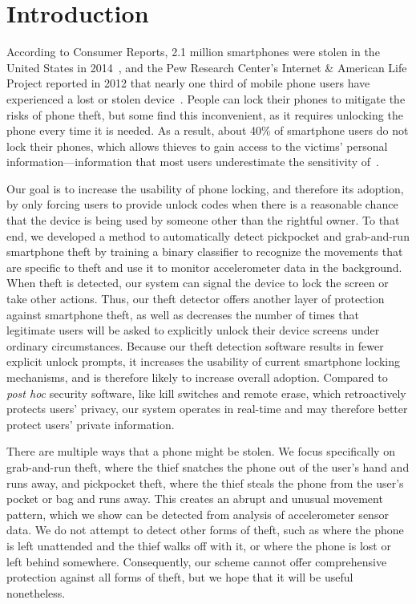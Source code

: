 \section{Introduction}

According to Consumer Reports, 2.1 million smartphones were stolen in the United States in 2014~\cite{deitrick:consumer}, and the Pew Research Center's Internet \& American Life Project reported in 2012 that nearly one third of mobile phone users have experienced a lost or stolen device~\cite{boyles:pew}.
People can lock their phones to mitigate the risks of phone theft, but some find this inconvenient, as it requires unlocking the phone every time it is needed.
As a result, about 40\% of smartphone users do not lock their phones, which allows thieves to gain access to the victims' personal information---information that most users underestimate the sensitivity of~\cite{egelman:lock}.

Our goal is to increase the usability of phone locking, and therefore its adoption, by only forcing users to provide unlock codes when there is a reasonable chance that the device is being used by someone other than the rightful owner. To that end, we developed a method to automatically detect pickpocket and grab-and-run smartphone theft by training a binary classifier to recognize the movements that are specific to theft and use it to monitor accelerometer data in the background. When theft is detected, our system can signal the device to lock the screen or take other actions. Thus, our theft detector offers another layer of protection against smartphone theft, as well as decreases the number of times that legitimate users will be asked to explicitly unlock their device screens under ordinary circumstances. Because our theft detection software results in fewer explicit unlock prompts, it increases the usability of current smartphone locking mechanisms, and is therefore likely to increase overall adoption. Compared to {\it post hoc} security software, like kill switches and remote erase, which retroactively protects users' privacy, our system operates in real-time and may therefore better protect users' private information.

There are multiple ways that a phone might be stolen.
We focus specifically on grab-and-run theft, where the thief snatches the phone out of the user's hand and runs away, and pickpocket theft, where the thief steals the phone from the user's pocket or bag and runs away.
This creates an abrupt and unusual movement pattern, which we show can be detected from analysis of accelerometer sensor data.
We do not attempt to detect other forms of theft, such as where the phone is left unattended and the thief walks off with it, or where the phone is lost or left behind somewhere.
Consequently, our scheme cannot offer comprehensive protection against all forms of theft, but we hope that it will be useful nonetheless.

